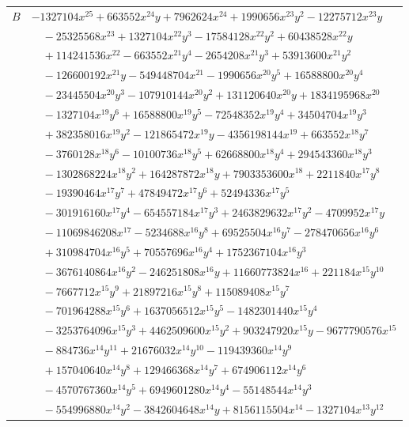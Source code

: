 \documentclass[11pt]{article}
\begin{document}
\begin{longtable}{@{}ll@{}}
$B$ & $-1327104x^{25}+663552x^{24}y+7962624x^{24}+1990656x^{23}y^{2}-12275712x^{23}y$\\
 & $\quad -25325568x^{23}+1327104x^{22}y^{3}-17584128x^{22}y^{2}+60438528x^{22}y$\\
 & $\quad +114241536x^{22}-663552x^{21}y^{4}-2654208x^{21}y^{3}+53913600x^{21}y^{2}$\\
 & $\quad -126600192x^{21}y-549448704x^{21}-1990656x^{20}y^{5}+16588800x^{20}y^{4}$\\
 & $\quad -23445504x^{20}y^{3}-107910144x^{20}y^{2}+131120640x^{20}y+1834195968x^{20}$\\
 & $\quad -1327104x^{19}y^{6}+16588800x^{19}y^{5}-72548352x^{19}y^{4}+34504704x^{19}y^{3}$\\
 & $\quad +382358016x^{19}y^{2}-121865472x^{19}y-4356198144x^{19}+663552x^{18}y^{7}$\\
 & $\quad -3760128x^{18}y^{6}-10100736x^{18}y^{5}+62668800x^{18}y^{4}+294543360x^{18}y^{3}$\\
 & $\quad -1302868224x^{18}y^{2}+164287872x^{18}y+7903353600x^{18}+2211840x^{17}y^{8}$\\
 & $\quad -19390464x^{17}y^{7}+47849472x^{17}y^{6}+52494336x^{17}y^{5}$\\
 & $\quad -301916160x^{17}y^{4}-654557184x^{17}y^{3}+2463829632x^{17}y^{2}-4709952x^{17}y$\\
 & $\quad -11069846208x^{17}-5234688x^{16}y^{8}+69525504x^{16}y^{7}-278470656x^{16}y^{6}$\\
 & $\quad +310984704x^{16}y^{5}+70557696x^{16}y^{4}+1752367104x^{16}y^{3}$\\
 & $\quad -3676140864x^{16}y^{2}-246251808x^{16}y+11660773824x^{16}+221184x^{15}y^{10}$\\
 & $\quad -7667712x^{15}y^{9}+21897216x^{15}y^{8}+115089408x^{15}y^{7}$\\
 & $\quad -701964288x^{15}y^{6}+1637056512x^{15}y^{5}-1482301440x^{15}y^{4}$\\
 & $\quad -3253764096x^{15}y^{3}+4462509600x^{15}y^{2}+903247920x^{15}y-9677790576x^{15}$\\
 & $\quad -884736x^{14}y^{11}+21676032x^{14}y^{10}-119439360x^{14}y^{9}$\\
 & $\quad +157040640x^{14}y^{8}+129466368x^{14}y^{7}+674906112x^{14}y^{6}$\\
 & $\quad -4570767360x^{14}y^{5}+6949601280x^{14}y^{4}-55148544x^{14}y^{3}$\\
 & $\quad -554996880x^{14}y^{2}-3842604648x^{14}y+8156115504x^{14}-1327104x^{13}y^{12}$\\

\end{longtable}
\end{document}
